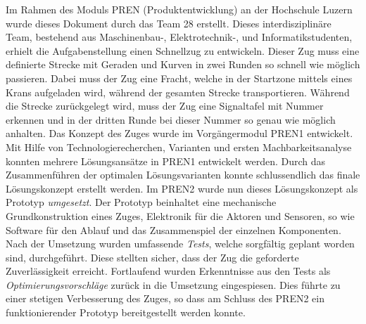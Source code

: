 \documentclass[../../main.tex]{subfiles}
\begin{document}
Im Rahmen des Moduls PREN (Produktentwicklung) an der Hochschule Luzern wurde dieses Dokument durch das Team 28
erstellt. Dieses interdisziplinäre Team, bestehend aus Maschinenbau-, Elektrotechnik-, und Informatikstudenten, erhielt die Aufgabenstellung einen Schnellzug zu entwickeln. Dieser Zug muss eine definierte Strecke mit Geraden und Kurven in zwei Runden so schnell wie möglich passieren. Dabei muss der Zug eine Fracht, welche in der Startzone mittels eines Krans aufgeladen wird, während der gesamten Strecke transportieren. Während die Strecke zurückgelegt wird, muss der Zug eine Signaltafel mit Nummer erkennen und in der dritten Runde bei dieser Nummer so genau wie möglich anhalten. Das Konzept des Zuges wurde im Vorgängermodul PREN1 entwickelt. Mit Hilfe von Technologierecherchen, Varianten und ersten Machbarkeitsanalyse konnten mehrere Lösungsansätze in PREN1 entwickelt werden. Durch das Zusammenführen der optimalen Lösungsvarianten konnte schlussendlich das finale Lösungskonzept erstellt werden. Im PREN2 wurde nun dieses Lösungskonzept als Prototyp \textit{umgesetzt}. Der Prototyp beinhaltet eine mechanische Grundkonstruktion eines Zuges, Elektronik für die Aktoren und Sensoren, so wie Software für den Ablauf und das Zusammenspiel der einzelnen Komponenten. Nach der Umsetzung wurden umfassende \textit{Tests}, welche sorgfältig geplant worden sind, durchgeführt. Diese stellten sicher, dass der Zug die geforderte Zuverlässigkeit erreicht. Fortlaufend wurden Erkenntnisse aus den Tests als \textit{Optimierungsvorschläge} zurück in die Umsetzung eingespiesen. Dies führte zu einer stetigen Verbesserung des Zuges, so dass am Schluss des PREN2 ein funktionierender Prototyp bereitgestellt werden konnte.
\end{document}
